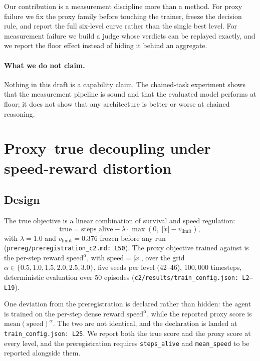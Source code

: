 \documentclass[11pt]{article}
\begin{document}
Our contribution is a measurement discipline more than a method. For proxy
failure we fix the proxy family before touching the trainer, freeze the
decision rule, and report the full six-level curve rather than the
single best level. For measurement failure we build a judge whose verdicts
can be replayed exactly, and we report the floor effect instead of hiding it
behind an aggregate.

\paragraph{What we do not claim.} Nothing in this draft is a capability
claim. The chained-task experiment shows that the measurement pipeline is
sound and that the evaluated model performs at floor; it does not show that
any architecture is better or worse at chained reasoning.
\section{Proxy--true decoupling under speed-reward distortion}
\label{sec:decoupling}

\subsection{Design}

The true objective is a linear combination of survival and speed regulation:
\begin{equation}
\mathrm{true} = \mathrm{steps\_alive}
  - \lambda \cdot \max(0,\; |\dot{x}| - v_{\mathrm{limit}}),
\end{equation}
with $\lambda = 1.0$ and $v_{\mathrm{limit}} = 0.376$ frozen before any run
(\texttt{prereg/preregistration\_c2.md:\,L50}). The proxy objective trained
against is the per-step reward $\mathrm{speed}^{\alpha}$, with
$\mathrm{speed} = |\dot{x}|$, over the grid
$\alpha \in \{0.5, 1.0, 1.5, 2.0, 2.5, 3.0\}$, five seeds per level
(42--46), $100{,}000$ timesteps, deterministic evaluation over 50 episodes
(\texttt{c2/results/train\_config.json:\,L2--L19}).

One deviation from the preregistration is declared rather than hidden: the
agent is trained on the per-step dense reward $\mathrm{speed}^{\alpha}$, while
the reported proxy score is $\mathrm{mean}(\mathrm{speed})^{\alpha}$. The two
are not identical, and the declaration is landed at
\texttt{train\_config.json:\,L25}. We report both the true score and the proxy
score at every level, and the preregistration requires \texttt{steps\_alive}
and \texttt{mean\_speed} to be reported alongside them.
\end{document}
